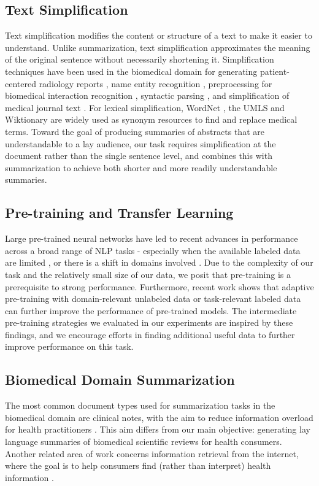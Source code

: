 \documentclass[letterpaper, table]{article} %
\begin{document}
\subsection{Text Simplification}
Text simplification \cite{Shardlow2014ASO} modifies the content or structure of a text to make it easier to understand. Unlike summarization, text simplification approximates the meaning of the original sentence without necessarily shortening it.
Simplification techniques have been used in the biomedical domain for generating patient-centered radiology reports \cite{qenam2017text}, name entity recognition \cite{habibi2017deep}, preprocessing for biomedical interaction recognition \cite{baumgartner2008concept}, syntactic parsing \cite{jonnalagadda2010towards}, and simplification of medical journal text \cite{jonnalagadda2010towards}. For lexical simplification, WordNet \cite{miller1995wordnet}, the UMLS \cite{bodenreider2004unified} and Wiktionary \cite{zesch2008extracting} are widely used as synonym resources to find and replace medical terms. Toward the goal of producing summaries of abstracts that are understandable to a lay audience, our task requires simplification at the document rather than the single sentence level, and combines this with summarization to achieve both shorter and more readily
understandable summaries.
\subsection{Pre-training and Transfer Learning}
Large pre-trained neural networks have led to recent advances in performance across a broad range of NLP tasks \cite{peters2018elmo, Radford2018ImprovingLU,Devlin2019BERTPO} - especially when the available labeled data are limited \cite{brown2020language}, or there is a shift in domains involved \cite{Hendrycks2020PretrainedTI}. Due to the complexity of our task and the relatively small size of our data, we posit that pre-training is a prerequisite to strong performance. Furthermore, recent work shows that adaptive pre-training with domain-relevant unlabeled data \cite{Gururangan2020DontSP} or task-relevant labeled data \cite{Pruksachatkun2020IntermediateTaskTL} can further improve the performance of pre-trained models. The intermediate pre-training strategies we evaluated in our experiments are inspired by these findings, and we encourage efforts in finding additional useful data to further improve performance on this task.
\subsection{Biomedical Domain Summarization}
The most common document types used for summarization tasks in the biomedical domain are clinical notes, with the aim to reduce information overload for health practitioners \cite{pivovarov2015automated, feblowitz2011summarization, molla2011development}. This aim differs from our main objective: generating lay language summaries of biomedical scientific reviews for health consumers. Another related area of work concerns information retrieval from the internet, where the goal is to help consumers find (rather than interpret) health information \cite{goeuriot2020overview}.
\end{document}
